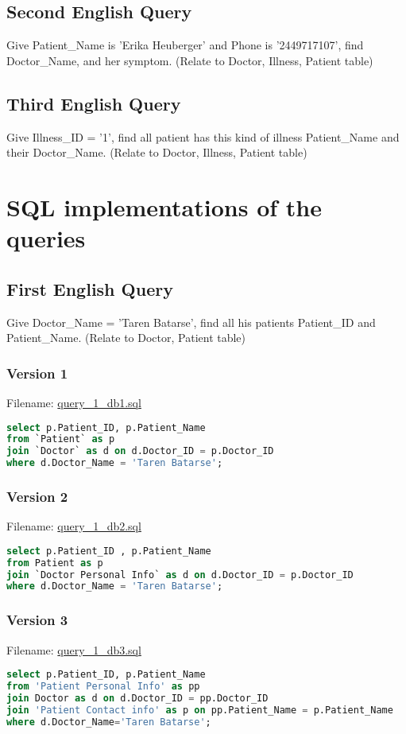 \documentclass[12pt,arial]{article}
\begin{document}
\subsection{Second English Query}
Give Patient\_Name is 'Erika Heuberger' and Phone is '2449717107', find Doctor\_Name, and her symptom.
(Relate to Doctor, Illness, Patient table)
\subsection{Third English Query}
Give Illness\_ID = '1', find all patient has this kind of illness Patient\_Name and their Doctor\_Name.
(Relate to Doctor, Illness, Patient table)


\section{SQL implementations of the queries}
\subsection{First English Query}
Give Doctor\_Name = 'Taren Batarse', find all his patients Patient\_ID and Patient\_Name.
(Relate to Doctor, Patient table)
\subsubsection{Version 1}
Filename: \url{query_1_db1.sql}
\begin{lstlisting}[language=SQL]
select p.Patient_ID, p.Patient_Name
from `Patient` as p
join `Doctor` as d on d.Doctor_ID = p.Doctor_ID
where d.Doctor_Name = 'Taren Batarse';
\end{lstlisting}
\subsubsection{Version 2}
Filename: \url{query_1_db2.sql}
\begin{lstlisting}[language=SQL]
select p.Patient_ID , p.Patient_Name
from Patient as p
join `Doctor Personal Info` as d on d.Doctor_ID = p.Doctor_ID
where d.Doctor_Name = 'Taren Batarse';
\end{lstlisting}
\subsubsection{Version 3}
Filename: \url{query_1_db3.sql}
\begin{lstlisting}[language=SQL]
select p.Patient_ID, p.Patient_Name 
from 'Patient Personal Info' as pp
join Doctor as d on d.Doctor_ID = pp.Doctor_ID
join 'Patient Contact info' as p on pp.Patient_Name = p.Patient_Name
where d.Doctor_Name='Taren Batarse';
\end{lstlisting}
\end{document}
